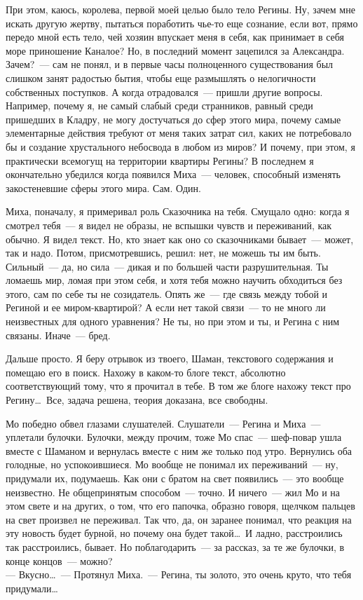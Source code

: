 При этом, каюсь, королева, первой моей целью было тело Регины. Ну, зачем мне 
искать другую жертву, пытаться поработить чье-то еще сознание, если вот, прямо 
передо мной есть тело, чей хозяин впускает меня в себя, как принимает в себя 
море приношение Каналое? Но, в последний момент зацепился за Александра. 
Зачем?~--- сам не понял, и в первые часы полноценного существования был слишком занят 
радостью бытия, чтобы еще размышлять о нелогичности собственных поступков. А 
когда отрадовался~--- пришли другие вопросы. Например, почему я, не самый 
слабый среди странников, равный среди пришедших в Кладру, не могу достучаться до сфер 
этого мира, почему самые элементарные действия требуют от меня таких затрат 
сил, каких не потребовало бы и создание хрустального небосвода в любом из миров? И 
почему, при этом, я практически всемогущ на территории квартиры Регины? В 
последнем я окончательно убедился когда появился Миха~--- человек, способный 
изменять закостеневшие сферы этого мира. Сам. Один.

Миха, поначалу, я примеривал роль Сказочника на тебя. Смущало одно: когда я 
смотрел тебя~--- я видел не образы, не вспышки чувств и переживаний, как 
обычно. Я видел текст. Но, кто знает как оно со сказочниками бывает~--- может, так и 
надо. Потом, присмотревшись, решил: нет, не можешь ты им быть. Сильный~--- да, но 
сила~--- дикая и по большей части разрушительная. Ты ломаешь мир, ломая при этом себя, и 
хотя тебя можно научить обходиться без этого, сам по себе ты не созидатель. 
Опять же~--- где связь между тобой и Региной и ее миром-квартирой? А если нет 
такой связи~--- то не много ли неизвестных для одного уравнения? Не ты, но при 
этом и ты, и Регина с ним связаны. Иначе~--- бред.

Дальше просто. Я беру отрывок из твоего, Шаман, текстового содержания и помещаю 
его в поиск. Нахожу в каком-то блоге текст, абсолютно соответствующий тому, что 
я прочитал в тебе. В том же блоге нахожу текст про Регину\ldots\ Все, задача 
решена, теория доказана, все свободны.

Мо победно обвел глазами слушателей. Слушатели~--- Регина и Миха~--- уплетали 
булочки. Булочки, между прочим, тоже Мо спас~--- шеф-повар ушла вместе с 
Шаманом и вернулась вместе с ним же только под утро. Вернулись оба голодные, но 
успокоившиеся. Мо вообще не понимал их переживаний~--- ну, придумали их, 
подумаешь. Как они с братом на свет появились~--- это вообще неизвестно. Не 
общепринятым способом~--- точно. И ничего~--- жил Мо и на этом свете и на 
других, о том, что его папочка, образно говоря, щелчком пальцев на свет произвел не 
переживал. Так что, да, он заранее понимал, что реакция на эту новость будет 
бурной, но почему она будет такой\ldots\ И ладно, расстроились так 
расстроились, бывает. Но поблагодарить~--- за рассказ, за те же булочки, в конце концов~--- 
можно?\\
--- Вкусно\ldots~--- Протянул Миха.~--- Регина, ты золото, это очень круто, что 
тебя придумали\ldots


